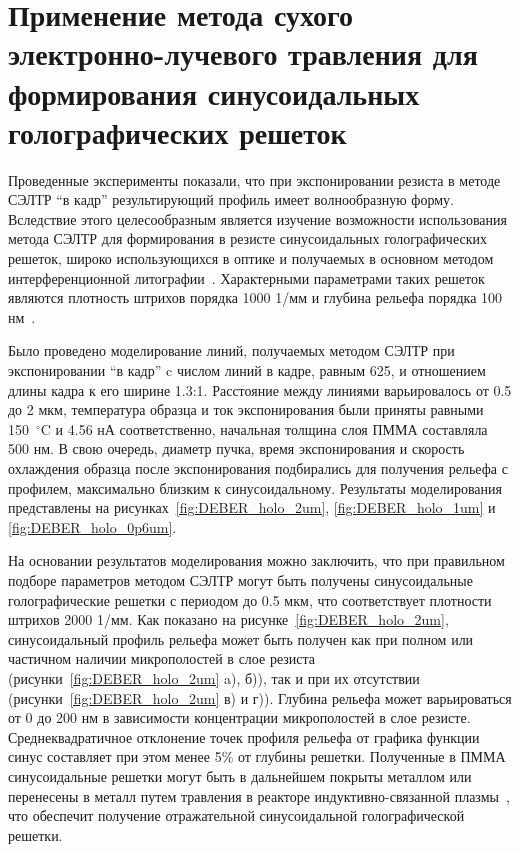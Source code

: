 \section{Применение метода сухого электронно-лучевого травления для формирования синусоидальных голографических решеток}

Проведенные эксперименты показали, что при экспонировании резиста в методе СЭЛТР ``в кадр'' результирующий профиль имеет волнообразную форму. Вследствие этого целесообразным является изучение возможности использования метода СЭЛТР для формирования в резисте синусоидальных голографических решеток, широко использующихся в оптике и получаемых в основном методом интерференционной литографии~\cite{Harrison2004_sin_gratings, Tishchenko2017_sin_gratings}. Характерными параметрами таких решеток являются плотность штрихов порядка 1000 1/мм и глубина рельефа порядка 100 нм~\cite{Harvey2020_diffraction_gratings}.

Было проведено моделирование линий, получаемых методом СЭЛТР при экспонировании ``в кадр'' c числом линий в кадре, равным 625, и отношением длины кадра к его ширине 1.3:1. Расстояние между линиями варьировалось от 0.5 до 2 мкм, температура образца и ток экспонирования были приняты равными 150~$^\circ$C и 4.56 нА соответственно, начальная толщина слоя ПММА составляла 500 нм. В свою очередь, диаметр пучка, время экспонирования и скорость охлаждения образца после экспонирования подбирались для получения рельефа с профилем, максимально близким к синусоидальному. Результаты моделирования представлены на рисунках~\ref{fig:DEBER_holo_2um}, \ref{fig:DEBER_holo_1um} и \ref{fig:DEBER_holo_0p6um}.

На основании результатов моделирования можно заключить, что при правильном подборе параметров методом СЭЛТР могут быть получены синусоидальные голографические решетки с периодом до 0.5 мкм, что соответствует плотности штрихов 2000 1/мм. Как показано на рисунке~\ref{fig:DEBER_holo_2um}, синусоидальный профиль рельефа может быть получен как при полном или частичном наличии микрополостей в слое резиста (рисунки~\ref{fig:DEBER_holo_2um} a), б)), так и при их отсутствии (рисунки~\ref{fig:DEBER_holo_2um} в) и г)). Глубина рельефа может варьироваться от 0 до 200 нм в зависимости концентрации микрополостей в слое резисте. Среднеквадратичное отклонение точек профиля рельефа от графика функции синус составляет при этом менее 5\% от глубины решетки. Полученные в ПММА синусоидальные решетки могут быть в дальнейшем покрыты металлом или перенесены в металл путем травления в реакторе индуктивно-связанной плазмы~\cite{Bruk_2016_mee}, что обеспечит получение отражательной синусоидальной голографической решетки.

